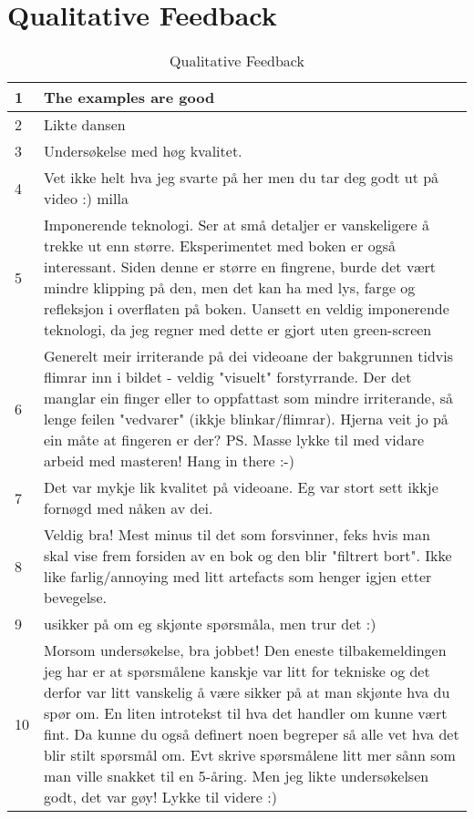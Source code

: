\chapter{Qualitative Feedback}\label{cha:appendix-qualitative}


\begin{longtable}{p{0.5cm}p{11cm}}
\caption{Qualitative Feedback}
\label{tab:qualitative_feedback}\\
    \hline
        1 & The examples are good \\
        \hline
        2 & Likte dansen \\
        \hline
        3 & Undersøkelse med høg kvalitet.\\
        \hline
        4 & Vet ikke helt hva jeg svarte på her men du tar deg godt ut på video :) milla \\
        \hline
        5 & Imponerende teknologi. Ser at små detaljer er vanskeligere å trekke ut enn større. Eksperimentet med boken er også interessant. Siden denne er større en fingrene, burde det vært mindre klipping på den, men det kan ha med lys, farge og refleksjon i overflaten på boken. Uansett en veldig imponerende teknologi, da jeg regner med dette er gjort uten green-screen \\
        \hline
        6 & Generelt meir irriterande på dei videoane der bakgrunnen tidvis flimrar inn i bildet - veldig "visuelt" forstyrrande. Der det manglar ein finger eller to oppfattast som mindre irriterande, så lenge feilen "vedvarer" (ikkje blinkar/flimrar). Hjerna veit jo på ein måte at fingeren er der? PS. Masse lykke til med vidare arbeid med masteren! Hang in there :-)\\
        \hline
        7 & Det var mykje lik kvalitet på videoane. Eg var stort sett ikkje fornøgd med nåken av dei. \\
        \hline
        8 & Veldig bra! Mest minus til det som forsvinner, feks hvis man skal vise frem forsiden av en bok og den blir "filtrert bort". Ikke like farlig/annoying med litt artefacts som henger igjen etter bevegelse.\\
        \hline
        9 & usikker på om eg skjønte spørsmåla, men trur det :) \\
        \hline
        10 & Morsom undersøkelse, bra jobbet! Den eneste tilbakemeldingen jeg har er at spørsmålene kanskje var litt for tekniske og det derfor var litt vanskelig å være sikker på at man skjønte hva du spør om. En liten introtekst til hva det handler om kunne vært fint. Da kunne du også definert noen begreper så alle vet hva det blir stilt spørsmål om. Evt skrive spørsmålene litt mer sånn som man ville snakket til en 5-åring. Men jeg likte undersøkelsen godt, det var gøy! Lykke til videre :) \\

\end{longtable}
